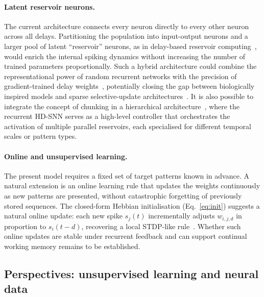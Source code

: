 \documentclass{scrartcl}
\newcommand{\citep}[1]{\parencite{#1}}
\begin{document}
\paragraph{Latent reservoir neurons.}
The current architecture connects every neuron directly to every other neuron across all delays. Partitioning the population into input-output neurons and a larger pool of latent ``reservoir'' neurons, as in delay-based reservoir computing~\citep{Paugam-Moisy2008}, would enrich the internal spiking dynamics without increasing the number of trained parameters proportionally. Such a hybrid architecture could combine the representational power of random recurrent networks with the precision of gradient-trained delay weights~\citep{Neftci2019a}, potentially closing the gap between biologically inspired models and sparse selective-update architectures~\citep{Yin2026}. It is also possible to integrate the concept of chunking in a hierarchical architecture~\citep{Zhong2026}, where the recurrent HD-SNN serves as a high-level controller that orchestrates the activation of multiple parallel reservoirs, each specialised for different temporal scales or pattern types.

\paragraph{Online and unsupervised learning.}
The present model requires a fixed set of target patterns known in advance. A natural extension is an online learning rule that updates the weights continuously as new patterns are presented, without catastrophic forgetting of previously stored sequences. The closed-form Hebbian initialisation (Eq.~\ref{eq:init}) suggests a natural online update: each new spike $s_j(t)$ incrementally adjusts $w_{i, j, d}$ in proportion to $s_i(t-d)$, recovering a local STDP-like rule~\citep{Izhikevich2006}. Whether such online updates are stable under recurrent feedback and can support continual working memory remains to be established.

\subsection{Perspectives: unsupervised learning and neural data}
\end{document}

